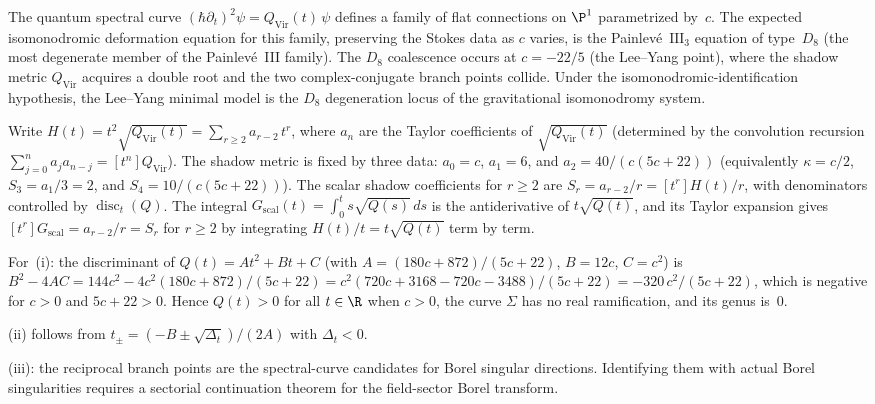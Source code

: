 \begin{remark}%
\label{rem:painleve-iii3}%
%
%
The quantum spectral curve $(\hbar\partial_t)^2\psi = Q_{\mathrm{Vir}}(t)\,\psi$
defines a family of flat connections on $\P^1$ parametrized by~$c$.
The expected isomonodromic deformation equation for this family,
preserving the Stokes data as $c$ varies, is the
Painlev\'e~$\mathrm{III}_3$ equation of type~$D_8$ (the most
degenerate member of the Painlev\'e~III family).
The $D_8$ coalescence occurs at $c = -22/5$ (the Lee--Yang
point), where the shadow metric
$Q_{\mathrm{Vir}}$ acquires a double root and the two complex-conjugate
branch points collide. Under the isomonodromic-identification
hypothesis, the Lee--Yang minimal model is the $D_8$ degeneration
locus of the gravitational isomonodromy system.
\end{remark}

\begin{remark}
Write $H(t) = t^2\sqrt{Q_{\mathrm{Vir}}(t)} = \sum_{r \ge 2} a_{r-2}\,t^r$,
where $a_n$ are the Taylor coefficients of $\sqrt{Q_{\mathrm{Vir}}(t)}$
(determined by the convolution recursion $\sum_{j=0}^n a_j a_{n-j}
= [t^n]Q_{\mathrm{Vir}}$). The shadow metric is fixed by three
data: $a_0 = c$, $a_1 = 6$, and $a_2 = 40/(c(5c+22))$
(equivalently $\kappa = c/2$, $S_3=a_1/3=2$, and
$S_4 = 10/(c(5c+22))$).
The scalar shadow coefficients for $r \ge 2$ are
$S_r = a_{r-2}/r = [t^r]H(t)/r$, with denominators
controlled by $\operatorname{disc}_t(Q)$. The integral
$G_{\mathrm{scal}}(t) = \int_0^t s\sqrt{Q(s)}\,ds$ is the
antiderivative of $t\sqrt{Q(t)}$, and its Taylor expansion gives
$[t^r]G_{\mathrm{scal}} = a_{r-2}/r = S_r$ for $r \ge 2$
by integrating $H(t)/t = t\sqrt{Q(t)}$ term by term.

For~(i): the discriminant of $Q(t) = At^2 + Bt + C$ (with
$A = (180c+872)/(5c+22)$, $B = 12c$, $C = c^2$) is
$B^2 - 4AC = 144c^2 - 4c^2(180c+872)/(5c+22)
= c^2(720c + 3168 - 720c - 3488)/(5c+22)
= -320\,c^2/(5c+22)$,
which is negative for $c > 0$ and $5c + 22 > 0$. Hence $Q(t) > 0$
for all $t \in \R$ when $c > 0$, the curve $\Sigma$ has no real
ramification, and its genus is~$0$.

(ii) follows from $t_\pm = (-B \pm \sqrt{\Delta_t})/(2A)$ with
$\Delta_t < 0$.

(iii): the reciprocal branch points are the spectral-curve candidates
for Borel singular directions. Identifying them with actual Borel
singularities requires a sectorial continuation theorem for the
field-sector Borel transform.
\end{remark}

